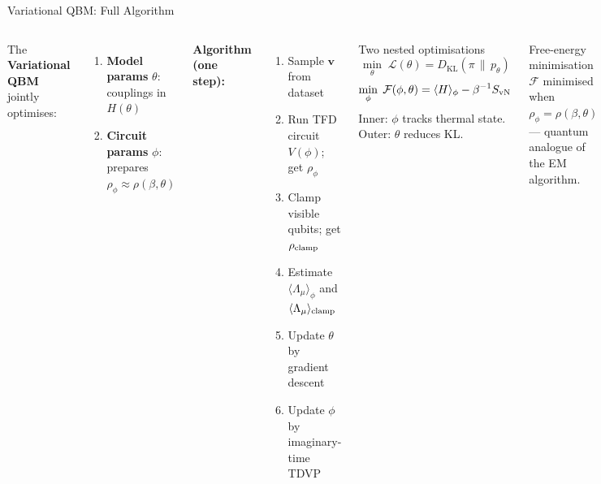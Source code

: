 \documentclass[aspectratio=169,10pt]{beamer}
\newcommand{\KL}[2]{D_{\mathrm{KL}}\!\left(#1\,\|\,#2\right)}
\begin{document}
\begin{frame}{Variational QBM: Full Algorithm}
  \begin{columns}[T]
      {\small The \textbf{Variational QBM} jointly optimises:}
      \begin{enumerate}\small\itemsep0pt
        \item \textbf{Model params} $\theta$: couplings in $H(\theta)$
        \item \textbf{Circuit params} $\phi$:
              prepares $\rho_\phi\approx\rho(\beta,\theta)$
      \end{enumerate}
      {\small\textbf{Algorithm (one step):}}
      \begin{enumerate}\small\itemsep0pt
        \item Sample $\mathbf{v}$ from dataset
        \item Run TFD circuit $V(\phi)$; get $\rho_\phi$
        \item Clamp visible qubits; get $\rho_{\rm clamp}$
        \item Estimate $\langle\Lambda_\mu\rangle_\phi$
              and $\langle\Lambda_\mu\rangle_{\rm clamp}$
        \item Update $\theta$ by gradient descent
        \item Update $\phi$ by imaginary-time TDVP
      \end{enumerate}
      \begin{alertblock}{Two nested optimisations}
        \small
        \vspace{-4pt}
        \[ \min_\theta\;\mathcal{L}(\theta)=\KL{\pi}{p_\theta} \]
        \[ \min_\phi\;\mathcal{F}(\phi,\theta)
           =\langle H\rangle_\phi-\beta^{-1}S_{\rm vN} \]
        \vspace{-6pt}
        Inner: $\phi$ tracks thermal state.\\
        Outer: $\theta$ reduces KL.
      \end{alertblock}
      \vspace{0.08cm}
      \begin{block}{Free-energy minimisation}
        {\small $\mathcal{F}$ minimised when
        $\rho_\phi=\rho(\beta,\theta)$ —
        quantum analogue of the EM algorithm.}
      \end{block}
  \end{columns}
\end{frame}
\end{document}
